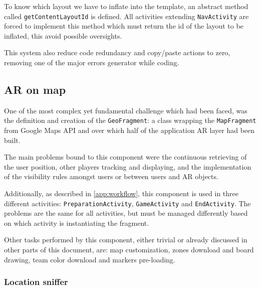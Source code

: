 			To know which layout we have to inflate into the template, an abstract method called \lstinline|getContentLayoutId| is defined.
			All activities extending \lstinline|NavActivity| are forced to implement this method which must return the id of the layout to be inflated, this avoid possible oversights.
			
			This system also reduce code redundancy and copy/paste actions to zero, removing one of the major errors generator while coding.
		
		\subsection{AR on map}\label{focus:map}
		
			One of the most complex yet fundamental challenge which had been faced, was the definition and creation of the \lstinline|GeoFragment|: a class wrapping the \lstinline|MapFragment| from Google Maps API and over which half of the application AR layer had been built.
			
			The main problems bound to this component were the continuous retrieving of the user position, other players tracking and displaying, and the implementation of the visibility rules amongst users or between users and AR objects.
			
			Additionally, as described in \autoref{app:workflow}, this component is used in three different activities: \lstinline|PreparationActivity|, \lstinline|GameActivity| and \lstinline|EndActivity|.
			The problems are the same for all activities, but must be managed differently based on which activity is instantiating the fragment.
			
			Other tasks performed by this component, either trivial or already discussed in other parts of this document, are: map customization, zones download and board drawing, team color download and markers pre-loading.
			
			\subsubsection{Location sniffer}
			
